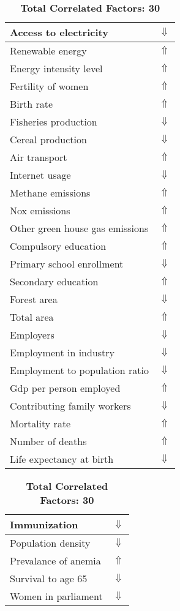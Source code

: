 \documentclass[12pt,notitlepage,oneside]{report}
\begin{document}
\begin{table}[!htb]
\caption{\textbf{Vaccine Status Is: No $\Uparrow$}}
\centering
\label{Correlated Socio-economic Factors0}
\begin{tabular}{|l|l|}
\hline
Access to electricity & $\Downarrow$\\ \hline
Renewable energy & $\Uparrow$\\ \hline
Energy intensity level & $\Uparrow$\\ \hline
Fertility of women & $\Uparrow$\\ \hline
Birth rate & $\Uparrow$\\ \hline
Fisheries production & $\Downarrow$\\ \hline
Cereal production & $\Downarrow$\\ \hline
Air transport  & $\Uparrow$\\ \hline
Internet usage & $\Downarrow$\\ \hline
Methane emissions & $\Uparrow$\\ \hline
Nox emissions & $\Uparrow$\\ \hline
Other green house gas emissions & $\Uparrow$\\ \hline
Compulsory education & $\Uparrow$\\ \hline
Primary school enrollment & $\Downarrow$\\ \hline
Secondary education & $\Uparrow$\\ \hline
Forest area & $\Downarrow$\\ \hline
Total area & $\Uparrow$\\ \hline
Employers & $\Downarrow$\\ \hline
Employment in industry & $\Downarrow$\\ \hline
Employment to population ratio & $\Downarrow$\\ \hline
Gdp per person employed & $\Uparrow$\\ \hline
Contributing family workers & $\Downarrow$\\ \hline
Mortality rate & $\Uparrow$\\ \hline
Number of deaths & $\Uparrow$\\ \hline
Life expectancy at birth & $\Downarrow$\\ \hline
\end{tabular}
\begin{tabular}{|l|l|}
\hline
Immunization & $\Downarrow$\\ \hline
Population density & $\Downarrow$\\ \hline
Prevalance of anemia & $\Uparrow$\\ \hline
Survival to age 65 & $\Downarrow$\\ \hline
Women in parliament & $\Downarrow$\\ \hline
\end{tabular}
\caption*{\textbf{Total Correlated Factors: 30}}
\end{table}
\end{document}
